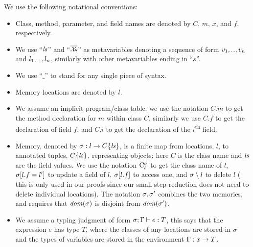 We use the following notational conventions:
\begin{itemize}
	\item Class, method, parameter, and field names are denoted by $C$, $m$, $x$, and $f$, respectively.
	\item We use ``$\mathit{ls}$'' and ``$\vs$'' as metavariables denoting a sequence of form $\range{v}$ and $\range{l}$, similarly with other metavariables ending in ``$s$''.
	\item We use ``$\_$'' to stand for any single piece of syntax.
	\item Memory locations are denoted by $l$.
	\item We assume an implicit program/class table; we use the notation $C.m$ to get the method declaration for $m$ within class $C$, similarly we use $C.f$ to get the declaration of field $f$, and $C.i$ to get the declaration of the $i$\textsuperscript{th} field.
	\item Memory, denoted by $\sigma : l\rightarrow C\{\mathit{ls}\}$, is a finite map from locations, $l$, to annotated tuples, $C\{\mathit{ls}\}$, representing objects; here $C$ is the class name and $\mathit{ls}$ are the 
	field values.
	We use the notation $\mathrm{C}^{\sigma}_{l}$ to get the class name of $l$, $\sigma[l.f=l']$ to update a field of $l$, $\sigma[l.f]$ to access one, and $\sigma \setminus l$ to delete $l$ (
this is only used in our proofs since our small step reduction does not need to delete individual locations). The notation $\sigma,\sigma'$ combines the two memories, and requires that $\mathit{dom}(\sigma)$ is disjoint from $\mathit{dom}(\sigma')$.
	\item We assume a typing judgment of form $\ty{e}{T}$, this says that the expression $e$ has type $T$,
	where the classes of any locations are stored in $\sigma$ and the types of variables are stored in the environment $\Gamma : x\rightarrow T$.
\end{itemize}

